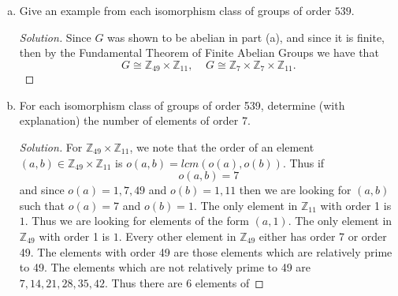\documentclass[12pt]{article}
\newenvironment{solution}
{\renewcommand\qedsymbol{$\blacksquare$}\begin{proof}[Solution]}
{\end{proof}}
\begin{document}
\begin{enumerate}
\begin{enumerate}[(a)]
\begin{proof}
                        and $G$ is therefore abelian as the product of abelian
                        groups. 
                    \end{proof}
                \item Give an example from each isomorphism class of groups of
                    order $539$. 
                    \begin{solution}
                        Since $G$ was shown to be abelian in part (a), and
                        since it is finite, then by the Fundamental Theorem of
                        Finite Abelian Groups we have that 
                        \begin{equation*}
                            G\cong\mathbb{Z}_{49}\times\mathbb{Z}_{11},
                            \;\;\;\;
                            G\cong\mathbb{Z}_7\times\mathbb{Z}_7\times\mathbb{Z}_{11}.
                        \end{equation*}
                    \end{solution}
                \item For each isomorphism class of groups of order 539,
                    determine (with explanation) the number of elements of
                    order 7. 
                    \begin{solution}
                        For $\mathbb{Z}_{49}\times\mathbb{Z}_{11}$, we note
                        that the order of an element $(a,
                        b)\in\mathbb{Z}_{49}\times\mathbb{Z}_{11}$ is $o(a,
                        b)=lcm(o(a), o(b))$. Thus if 
                        \begin{equation*}
                            o(a, b)=7
                        \end{equation*}
                        and since $o(a)=1, 7, 49$ and $o(b)=1, 11$ then we are
                        looking for $(a, b)$ such that $o(a)=7$ and $o(b)=1$.
                        The only element in $\mathbb{Z}_{11}$ with order 1 is
                        $1$. Thus we are looking for elements of the form $(a,
                        1)$. The only element in $\mathbb{Z}_{49}$ with order
                        1 is $1$. Every other element in $\mathbb{Z}_{49}$
                        either has order 7 or order 49. The elements with order
                        49 are those elements which are relatively prime to 49.
                        The elements which are not relatively prime to 49 are
                        $7, 14, 21, 28, 35, 42$. Thus there are 6 elements of

\end{solution}
\end{enumerate}
\end{enumerate}
\end{document}
